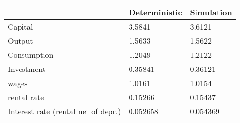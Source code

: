 \begin{tabular}{lll}
& Deterministic & Simulation \\ 
\hline 
Capital & 3.5841 & 3.6121 \\ 
Output & 1.5633 & 1.5622 \\ 
Consumption & 1.2049 & 1.2122 \\ 
Investment & 0.35841 & 0.36121 \\ 
wages & 1.0161 & 1.0154 \\ 
rental rate & 0.15266 & 0.15437 \\ 
Interest rate (rental net of depr.) & 0.052658 & 0.054369 \\ 
\hline 
\end{tabular}